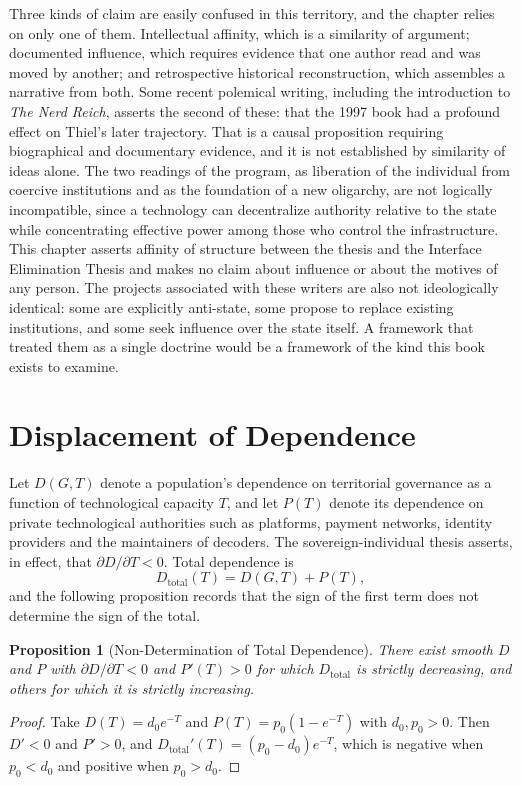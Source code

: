 \documentclass[11pt,twoside,openany]{book}
\newtheorem{proposition}[theorem]{Proposition}
\theoremstyle{definition}
\theoremstyle{remark}
\begin{document}
Three kinds of claim are easily confused in this territory, and the chapter relies on only one of them. Intellectual affinity, which is a similarity of argument; documented influence, which requires evidence that one author read and was moved by another; and retrospective historical reconstruction, which assembles a narrative from both. Some recent polemical writing, including the introduction to \emph{The Nerd Reich}, asserts the second of these: that the 1997 book had a profound effect on Thiel's later trajectory. That is a causal proposition requiring biographical and documentary evidence, and it is not established by similarity of ideas alone. The two readings of the program, as liberation of the individual from coercive institutions and as the foundation of a new oligarchy, are not logically incompatible, since a technology can decentralize authority relative to the state while concentrating effective power among those who control the infrastructure. This chapter asserts affinity of structure between the thesis and the Interface Elimination Thesis and makes no claim about influence or about the motives of any person. The projects associated with these writers are also not ideologically identical: some are explicitly anti-state, some propose to replace existing institutions, and some seek influence over the state itself. A framework that treated them as a single doctrine would be a framework of the kind this book exists to examine.

\section{Displacement of Dependence}

Let $D(G,T)$ denote a population's dependence on territorial governance as a function of technological capacity $T$, and let $P(T)$ denote its dependence on private technological authorities such as platforms, payment networks, identity providers and the maintainers of decoders. The sovereign-individual thesis asserts, in effect, that $\partial D/\partial T<0$. Total dependence is
\[
D_{\mathrm{total}}(T)=D(G,T)+P(T),
\]
and the following proposition records that the sign of the first term does not determine the sign of the total.

\begin{proposition}[Non-Determination of Total Dependence]\label{prop:totaldep}
There exist smooth $D$ and $P$ with $\partial D/\partial T<0$ and $P'(T)>0$ for which $D_{\mathrm{total}}$ is strictly decreasing, and others for which it is strictly increasing.
\end{proposition}
\begin{proof}
Take $D(T)=d_0e^{-T}$ and $P(T)=p_0(1-e^{-T})$ with $d_0,p_0>0$. Then $D'<0$ and $P'>0$, and $D_{\mathrm{total}}'(T)=(p_0-d_0)e^{-T}$, which is negative when $p_0<d_0$ and positive when $p_0>d_0$.
\end{proof}
\end{document}
